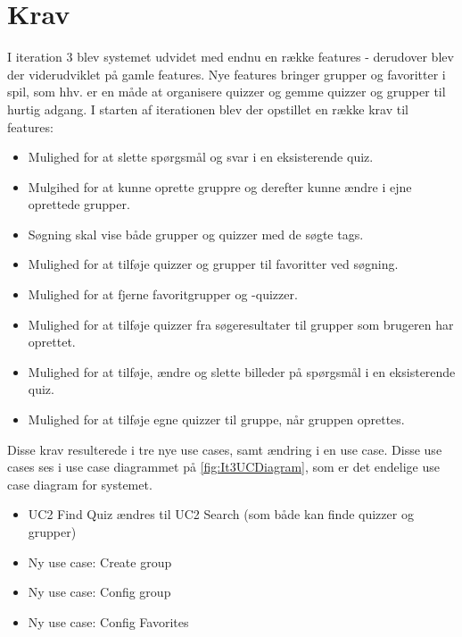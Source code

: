 \section{Krav}

I iteration 3 blev systemet udvidet med endnu en række features - derudover blev der viderudviklet på gamle features. Nye features bringer grupper og favoritter i spil, som hhv. er en måde at organisere quizzer og gemme quizzer og grupper til hurtig adgang.
I starten af iterationen blev der opstillet en række krav til features:

\begin{itemize}
	\item Mulighed for at slette spørgsmål og svar i en eksisterende quiz.
	\item Mulgihed for at kunne oprette gruppre og derefter kunne ændre i ejne oprettede grupper.
	\item Søgning skal vise både grupper og quizzer med de søgte tags.
	\item Mulighed for at tilføje quizzer og grupper til favoritter ved søgning.
	\item Mulighed for at fjerne favoritgrupper og -quizzer.
	\item Mulighed for at tilføje quizzer fra søgeresultater til grupper som brugeren har oprettet.
	\item Mulighed for at tilføje, ændre og slette billeder på spørgsmål i en eksisterende quiz.
	\item Mulighed for at tilføje egne quizzer til gruppe, når gruppen oprettes.
\end{itemize}

Disse krav resulterede i tre nye use cases, samt ændring i en use case. Disse use cases ses i use case diagrammet på \ref{fig:It3UCDiagram}, som er det endelige use case diagram for systemet.

\begin{itemize}
	\item UC2 Find Quiz ændres til UC2 Search (som både kan finde quizzer og grupper)
	\item Ny use case: Create group
	\item Ny use case: Config group
	\item Ny use case: Config Favorites
\end{itemize}

